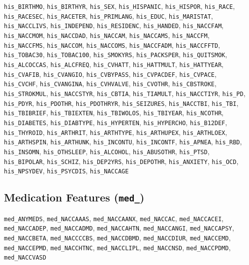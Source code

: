 \documentclass[11pt,a4paper]{article}
\begin{document}
\begin{small}
\texttt{his\_BIRTHMO}, \texttt{his\_BIRTHYR}, \texttt{his\_SEX}, \texttt{his\_HISPANIC}, \texttt{his\_HISPOR}, \texttt{his\_RACE}, \texttt{his\_RACESEC}, \texttt{his\_RACETER}, \texttt{his\_PRIMLANG}, \texttt{his\_EDUC}, \texttt{his\_MARISTAT}, \texttt{his\_NACCLIVS}, \texttt{his\_INDEPEND}, \texttt{his\_RESIDENC}, \texttt{his\_HANDED}, \texttt{his\_NACCFAM}, \texttt{his\_NACCMOM}, \texttt{his\_NACCDAD}, \texttt{his\_NACCAM}, \texttt{his\_NACCAMS}, \texttt{his\_NACCFM}, \texttt{his\_NACCFMS}, \texttt{his\_NACCOM}, \texttt{his\_NACCOMS}, \texttt{his\_NACCFADM}, \texttt{his\_NACCFFTD}, \texttt{his\_TOBAC30}, \texttt{his\_TOBAC100}, \texttt{his\_SMOKYRS}, \texttt{his\_PACKSPER}, \texttt{his\_QUITSMOK}, \texttt{his\_ALCOCCAS}, \texttt{his\_ALCFREQ}, \texttt{his\_CVHATT}, \texttt{his\_HATTMULT}, \texttt{his\_HATTYEAR}, \texttt{his\_CVAFIB}, \texttt{his\_CVANGIO}, \texttt{his\_CVBYPASS}, \texttt{his\_CVPACDEF}, \texttt{his\_CVPACE}, \texttt{his\_CVCHF}, \texttt{his\_CVANGINA}, \texttt{his\_CVHVALVE}, \texttt{his\_CVOTHR}, \texttt{his\_CBSTROKE}, \texttt{his\_STROKMUL}, \texttt{his\_NACCSTYR}, \texttt{his\_CBTIA}, \texttt{his\_TIAMULT}, \texttt{his\_NACCTIYR}, \texttt{his\_PD}, \texttt{his\_PDYR}, \texttt{his\_PDOTHR}, \texttt{his\_PDOTHRYR}, \texttt{his\_SEIZURES}, \texttt{his\_NACCTBI}, \texttt{his\_TBI}, \texttt{his\_TBIBRIEF}, \texttt{his\_TBIEXTEN}, \texttt{his\_TBIWOLOS}, \texttt{his\_TBIYEAR}, \texttt{his\_NCOTHR}, \texttt{his\_DIABETES}, \texttt{his\_DIABTYPE}, \texttt{his\_HYPERTEN}, \texttt{his\_HYPERCHO}, \texttt{his\_B12DEF}, \texttt{his\_THYROID}, \texttt{his\_ARTHRIT}, \texttt{his\_ARTHTYPE}, \texttt{his\_ARTHUPEX}, \texttt{his\_ARTHLOEX}, \texttt{his\_ARTHSPIN}, \texttt{his\_ARTHUNK}, \texttt{his\_INCONTU}, \texttt{his\_INCONTF}, \texttt{his\_APNEA}, \texttt{his\_RBD}, \texttt{his\_INSOMN}, \texttt{his\_OTHSLEEP}, \texttt{his\_ALCOHOL}, \texttt{his\_ABUSOTHR}, \texttt{his\_PTSD}, \texttt{his\_BIPOLAR}, \texttt{his\_SCHIZ}, \texttt{his\_DEP2YRS}, \texttt{his\_DEPOTHR}, \texttt{his\_ANXIETY}, \texttt{his\_OCD}, \texttt{his\_NPSYDEV}, \texttt{his\_PSYCDIS}, \texttt{his\_NACCAGE}
\end{small}

\subsection{Medication Features (\texttt{med\_})}

\begin{small}
\texttt{med\_ANYMEDS}, \texttt{med\_NACCAAAS}, \texttt{med\_NACCAANX}, \texttt{med\_NACCAC}, \texttt{med\_NACCACEI}, \texttt{med\_NACCADEP}, \texttt{med\_NACCADMD}, \texttt{med\_NACCAHTN}, \texttt{med\_NACCANGI}, \texttt{med\_NACCAPSY}, \texttt{med\_NACCBETA}, \texttt{med\_NACCCCBS}, \texttt{med\_NACCDBMD}, \texttt{med\_NACCDIUR}, \texttt{med\_NACCEMD}, \texttt{med\_NACCEPMD}, \texttt{med\_NACCHTNC}, \texttt{med\_NACCLIPL}, \texttt{med\_NACCNSD}, \texttt{med\_NACCPDMD}, \texttt{med\_NACCVASD}
\end{small}
\end{document}
